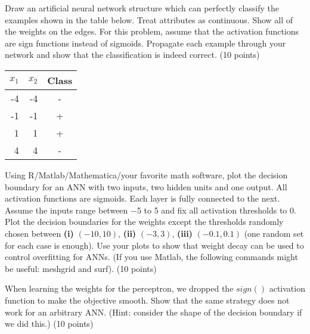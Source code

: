 \documentclass[fleqn]{homework}
\begin{document}
  \begin{problem}{3}
    \begin{question}
      Draw an artificial neural network structure which can perfectly classify
      the examples shown in the table below. Treat attributes as
      continuous. Show all of the weights on the edges. For this problem, assume
      that the activation functions are sign functions instead of
      sigmoids. Propagate each example through your network and show that the
      classification is indeed correct. (10 points)

      \begin{tabular}{|rr|c|}
        \hline
        $x_1$ & $x_2$ & Class \\
        \hline
        -4 & -4 & - \\
        -1 & -1 & + \\
        1 & 1 & + \\
        4 & 4 & - \\
        \hline
      \end{tabular}
    \end{question}
  \end{problem}

  \begin{problem}{4}
    \begin{question}
      Using R/Matlab/Mathematica/your favorite math software, plot the decision
      boundary for an ANN with two inputs, two hidden units and one output. All
      activation functions are sigmoids.  Each layer is fully connected to the
      next. Assume the inputs range between −5 to 5 and fix all activation
      thresholds to 0. Plot the decision boundaries for the weights except the
      thresholds randomly chosen between \textbf{(i)} $(−10,10)$, \textbf{(ii)}
      $(−3,3)$, \textbf{(iii)} $(−0.1,0.1)$ (one random set for each case is
      enough). Use your plots to show that weight decay can be used to control
      overfitting for ANNs. (If you use Matlab, the following commands might be
      useful: meshgrid and surf). (10 points)
    \end{question}
  \end{problem}

  \begin{problem}{5}
    \begin{question}
      When learning the weights for the perceptron, we dropped the $sign()$
      activation function to make the objective smooth. Show that the same
      strategy does not work for an arbitrary ANN.  (Hint: consider the shape of
      the decision boundary if we did this.) (10 points)
    \end{question}
  \end{problem}
\end{document}
